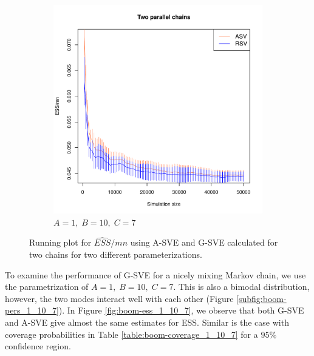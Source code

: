 \documentclass[11pt]{article}
\theoremstyle{remark}
\begin{document}
\begin{figure}[h]
    \begin{subfigure}[h]{.3\textwidth}
      \centering
      \includegraphics[width = \textwidth]{plots/boom-ess2.pdf}
      \caption{$A = 1, \; B=10, \; C = 7 $}
      \label{subfig:boom-ess2}
    \end{subfigure}
    \caption{Running plot for $\hat{ESS}/mn$ using A-SVE and G-SVE calculated for two chains for two different parameterizations.}
    \label{fig:boom-ess}
\end{figure}


To examine the performance of G-SVE for a nicely mixing Markov chain, we use the parametrization of $A = 1, \; B = 10, \; C=7$. This is also a bimodal distribution, however, the two modes interact well with each other (Figure \ref{subfig:boom-pers_1_10_7}). In Figure \ref{fig:boom-ess_1_10_7}, we observe that both G-SVE and A-SVE give almost the same estimates for ESS. Similar is the case with coverage probabilities in Table \ref{table:boom-coverage_1_10_7} for a $95\%$ confidence region.
\end{document}
